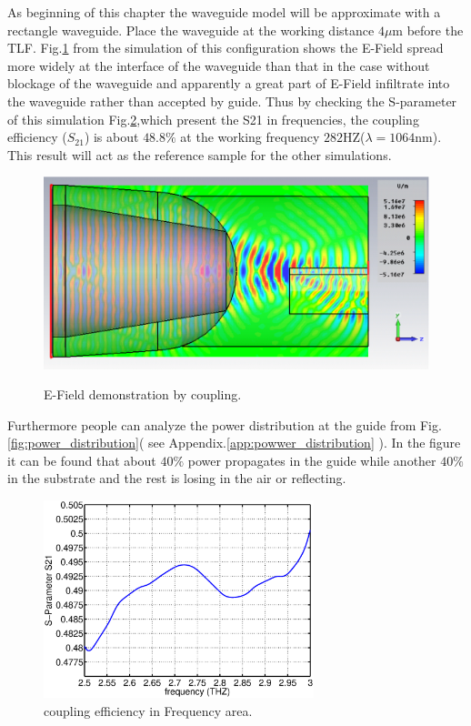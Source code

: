 As beginning of this chapter the waveguide model will be approximate with a rectangle waveguide. Place the waveguide at the working distance $4\mu$m before the TLF.  Fig.\quad\ref{fig:coupling_e_field} from the simulation of this configuration shows the E-Field spread more widely at the interface of the waveguide than that in the case without blockage of the waveguide and apparently a great part of E-Field infiltrate into the waveguide rather than accepted by guide. Thus by checking the S-parameter of this simulation Fig.\ref{fig:orignial_coupling_efficiency},which present the S21 in frequencies, the coupling efficiency ($S_{21}$) is about $48.8\%$ at the working frequency $282$HZ($\lambda=1064$nm). This result will act as the reference sample for the other simulations. 
\begin{figure}[!ht]
\centering
	\includegraphics[width=0.7 \textwidth]{bilder/cst_basic_waveguide_efield}
	\label{fig:coupling_e_field}
	\caption{E-Field demonstration by coupling.}
\end{figure}
Furthermore people can analyze the power distribution at the guide from Fig.\quad\ref{fig:power_distribution}( see Appendix.\quad\ref{app:powwer_distribution} ). In the figure it can be found that about $40\%$ power propagates in the guide while another $40\%$ in the substrate and the rest is losing in the air or reflecting.
\begin{figure}
\centering
\includegraphics[width=0.7\textwidth]{bilder/original_coupling_efficiency}
\caption{coupling efficiency in Frequency area.}
\label{fig:orignial_coupling_efficiency}
\end{figure}
